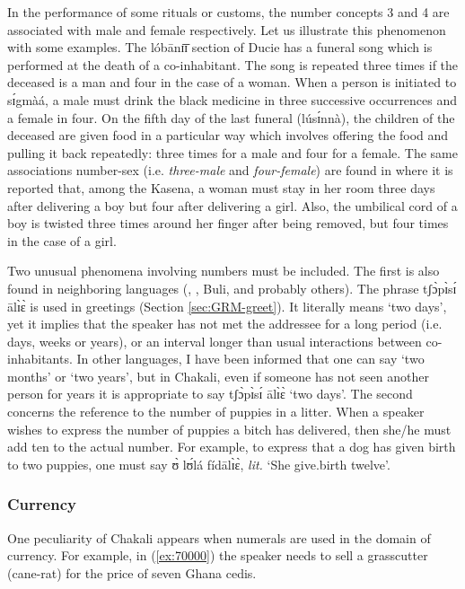 \begin{exe}
\begin{exe}
\begin{exe}
\begin{exe}
\begin{exe}
\begin{exe}
\begin{exe}
\begin{exe}
\begin{exe}
\begin{exe}
In the performance of some rituals or customs, the number concepts 3 and 4 are associated with male and female respectively. Let us illustrate this phenomenon with some examples. The {\sls lóbānɪ̄ɪ̄} section of Ducie has a funeral song which is performed at the death of a co-inhabitant. The song is repeated three times if the deceased is a man and four in the case of a woman. When a person is initiated to {\sls sɪ́gmàá}, a male must drink the black medicine in three successive occurrences and a female in four.  On the fifth day of the last funeral ({\sls lúsɪ́nnà}), the children of the deceased are given food in a particular way which involves offering the food and pulling  it back repeatedly: three times for a male and four for a female. The same associations number-sex (i.e. {\it three-male} and {\it four-female}) are found in \citet[68-70]{Card27} where it is reported that, among the Kasena, a woman must stay in her room three days after delivering a boy but four after delivering a girl. Also,  the umbilical cord of a boy is twisted three times around her finger after being removed, but four times in the case of a girl.


Two unusual phenomena involving numbers must be included. The first is also found in neighboring languages (, , Buli, and probably others). The phrase {\sls tʃɔ̀pɪ̀sɪ́ ālɪ̀ɛ̀} is used in greetings (Section \ref{sec:GRM-greet}).   It literally means `two days', yet it implies that the speaker has not met the addressee for a long period  (i.e. days, weeks or years), or an interval longer than usual interactions between co-inhabitants. In other languages, I have been informed that one can say `two months' or `two years', but in Chakali, even if someone has not seen another person for years it is appropriate to say  {\sls tʃɔ̀pɪ̀sɪ́ ālɪ̀ɛ̀}  `two days'. The second concerns the reference to the number of puppies in a litter. When a speaker wishes to express the number of puppies a bitch has delivered, then she/he must add ten to the actual number. For example,  to express that a dog has given birth to two puppies, one must say {\sls ʊ̀ lʊ́lá fídālɪ̀ɛ̀},  {\it lit.}  `She give.birth twelve'. 


\subsubsection{Currency}
\label{sec:NUM-currency}

One peculiarity of Chakali appears when numerals are used in the domain of currency. For example,  in (\ref{ex:70000}) the speaker needs to sell a grasscutter (cane-rat) for the price of seven Ghana cedis.



\end{exe}
\end{exe}
\end{exe}
\end{exe}
\end{exe}
\end{exe}
\end{exe}
\end{exe}
\end{exe}
\end{exe}
